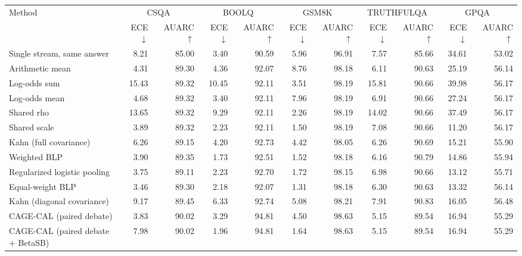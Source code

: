 \begin{tabular}{lrrrrrrrrrr}
\toprule
Method & \multicolumn{2}{c}{CSQA} & \multicolumn{2}{c}{BOOLQ} & \multicolumn{2}{c}{GSM8K} & \multicolumn{2}{c}{TRUTHFULQA} & \multicolumn{2}{c}{GPQA} \\
 & ECE $\downarrow$ & AUARC $\uparrow$ & ECE $\downarrow$ & AUARC $\uparrow$ & ECE $\downarrow$ & AUARC $\uparrow$ & ECE $\downarrow$ & AUARC $\uparrow$ & ECE $\downarrow$ & AUARC $\uparrow$ \\
\midrule
Single stream, same answer & 8.21 & 85.00 & 3.40 & 90.59 & 5.96 & 96.91 & 7.57 & 85.66 & 34.61 & 53.02 \\
Arithmetic mean & 4.31 & 89.30 & 4.36 & 92.07 & 8.76 & 98.18 & 6.11 & 90.63 & 25.19 & 56.14 \\
Log-odds sum & 15.43 & 89.32 & 10.45 & 92.11 & 3.51 & 98.19 & 15.81 & 90.66 & 39.98 & 56.17 \\
Log-odds mean & 4.68 & 89.32 & 3.40 & 92.11 & 7.96 & 98.19 & 6.91 & 90.66 & 27.24 & 56.17 \\
Shared rho & 13.65 & 89.32 & 9.29 & 92.11 & 2.26 & 98.19 & 14.02 & 90.66 & 37.49 & 56.17 \\
Shared scale & 3.89 & 89.32 & 2.23 & 92.11 & 1.50 & 98.19 & 7.08 & 90.66 & 11.20 & 56.17 \\
Kahn (full covariance) & 6.26 & 89.15 & 4.20 & 92.73 & 4.42 & 98.05 & 6.26 & 90.69 & 15.21 & 55.90 \\
Weighted BLP & 3.90 & 89.35 & 1.73 & 92.51 & 1.52 & 98.18 & 6.16 & 90.79 & 14.86 & 55.94 \\
Regularized logistic pooling & 3.75 & 89.11 & 2.23 & 92.70 & 1.72 & 98.15 & 6.98 & 90.66 & 13.12 & 55.71 \\
Equal-weight BLP & 3.46 & 89.30 & 2.18 & 92.07 & 1.31 & 98.18 & 6.30 & 90.63 & 13.32 & 56.14 \\
Kahn (diagonal covariance) & 9.17 & 89.45 & 6.33 & 92.74 & 5.08 & 98.21 & 7.91 & 90.83 & 16.05 & 56.48 \\
CAGE-CAL (paired debate) & 3.83 & 90.02 & 3.29 & 94.81 & 4.50 & 98.63 & 5.15 & 89.54 & 16.94 & 55.29 \\
CAGE-CAL (paired debate + BetaSB) & 7.98 & 90.02 & 1.96 & 94.81 & 1.64 & 98.63 & 5.15 & 89.54 & 16.94 & 55.29 \\
\bottomrule
\end{tabular}
